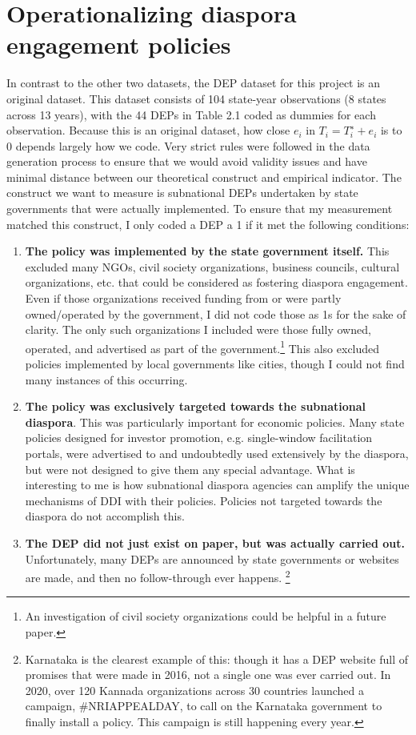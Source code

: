 \documentclass[doublespace,nopageskip]{UVAthesis}
\begin{document}
       \section{Operationalizing diaspora engagement policies} \label{ss:operationalizing DEPs}
			In contrast to the other two datasets, the DEP dataset for this project is an original dataset. This dataset consists of 104 state-year observations (8 states across 13 years), with the 44 DEPs in Table 2.1 coded as dummies for each observation.
            Because this is an original dataset, how close $e_i$ in $T_i​=T_i^∗​+e_i$ is to 0 depends largely how we code. Very strict rules were followed in the data generation process to ensure that we would avoid validity issues and have minimal distance between our theoretical construct and empirical indicator. The construct we want to measure is subnational DEPs undertaken by state governments that were actually implemented. To ensure that my measurement matched this construct, I only coded a DEP a 1 if it met the following conditions:
 \begin{enumerate}
     \item \textbf{The policy was implemented by the state government itself. }This excluded many NGOs, civil society organizations, business councils, cultural organizations, etc. that could be considered as fostering diaspora engagement. Even if those organizations received funding from or were partly owned/operated by the government, I did not code those as 1s for the sake of clarity. The only such organizations I included were those fully owned, operated, and advertised as part of the government.\footnote{An investigation of civil society organizations could be helpful in a future paper.} This also excluded policies implemented by local governments like cities, though I could not find many instances of this occurring.
     \item  \textbf{The policy was exclusively targeted towards the subnational diaspora}. This was particularly important for economic policies. Many state policies designed for investor promotion, e.g. single-window facilitation portals, were advertised to and undoubtedly used extensively by the diaspora, but were not designed to give them any special advantage. What is interesting to me is how subnational diaspora agencies can amplify the unique mechanisms of DDI with their policies. Policies not targeted towards the diaspora do not accomplish this.
     \item   \textbf{The DEP did not just exist on paper, but was actually carried out.} Unfortunately, many DEPs are announced by state governments or websites are made, and then no follow-through ever happens. \footnote{Karnataka is the clearest example of this: though it has a DEP website full of promises that were made in 2016, not a single one was ever carried out\citep{noauthor__nodate}. In 2020, over 120 Kannada organizations across 30 countries launched a campaign, \#NRIAPPEALDAY, to call on the Karnataka government to finally install a policy.\citet{noauthor_international_nodate} This campaign is still happening every year.}
 \end{enumerate}
\end{document}
